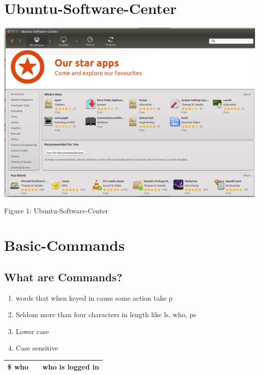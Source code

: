 \documentclass[12pt, a4paper]{report}
\begin{document}
\chapter{Ubuntu-Software-Center}
\includegraphics[width=\textwidth, angle=0]{04_usc.jpg}
\centerline{Figure 1: Ubuntu-Software-Center}
%
\chapter{Basic-Commands}
\section{What are Commands?}
\begin{enumerate}
\item words that when keyed in cause some action take p
\item Seldom more than four characters in length like ls, who, ps
\item Lower case
\item Case sensitive
\end{enumerate}
\begin{tabular}{|lcr|}\hline
\$ who && who is logged in \\ \hline
\end{tabular}
\end{document}
